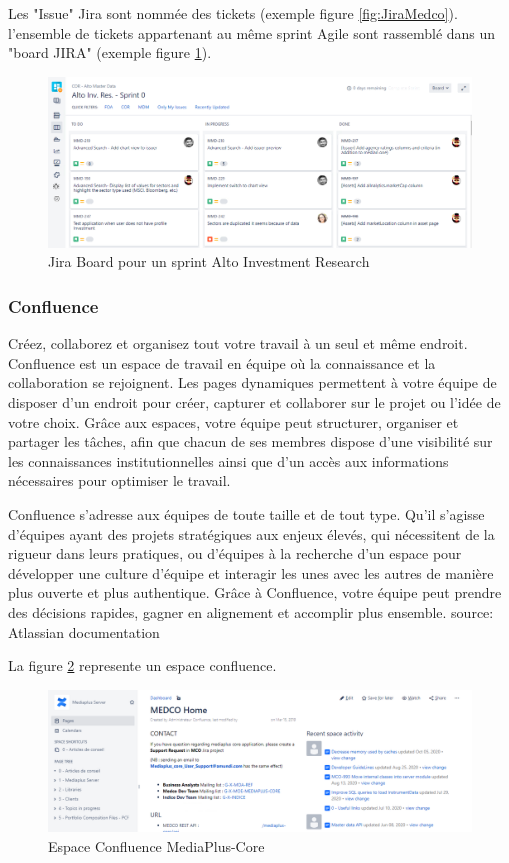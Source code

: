 \par Les "Issue" Jira sont nommée des tickets (exemple figure \ref{fig:JiraMedco}). l'ensemble de tickets appartenant au même sprint Agile sont rassemblé dans un "board JIRA" (exemple figure \ref{fig:JiraAlto}).
\clearpage
\begin{figure}[ht]
    \centering
    \includegraphics[width=\columnwidth]{img/Sprint Alto.png}
    \caption{Jira Board pour un sprint Alto Investment Research}
    \label{fig:JiraAlto}
\end{figure}
\subsubsection{Confluence}
\par Créez, collaborez et organisez tout votre travail à un seul et même endroit. Confluence est un espace de travail en équipe où la connaissance et la collaboration se rejoignent. Les pages dynamiques permettent à votre équipe de disposer d'un endroit pour créer, capturer et collaborer sur le projet ou l'idée de votre choix. Grâce aux espaces, votre équipe peut structurer, organiser et partager les tâches, afin que chacun de ses membres dispose d'une visibilité sur les connaissances institutionnelles ainsi que d'un accès aux informations nécessaires pour optimiser le travail.
\par Confluence s'adresse aux équipes de toute taille et de tout type. Qu'il s'agisse d'équipes ayant des projets stratégiques aux enjeux élevés, qui nécessitent de la rigueur dans leurs pratiques, ou d'équipes à la recherche d'un espace pour développer une culture d'équipe et interagir les unes avec les autres de manière plus ouverte et plus authentique. Grâce à Confluence, votre équipe peut prendre des décisions rapides, gagner en alignement et accomplir plus ensemble. {\tiny source: Atlassian documentation}
\par La figure \ref{fig:conf} represente un espace confluence.
\begin{figure}[ht]
    \centering
    \includegraphics[width=\columnwidth]{img/ConfMedco.png}
    \caption{Espace Confluence MediaPlus-Core}
    \label{fig:conf}
\end{figure}

